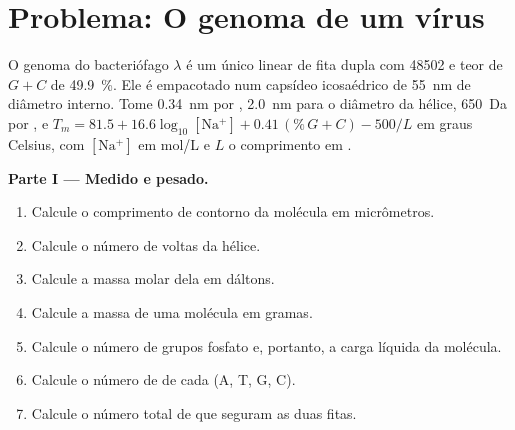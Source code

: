 \section{Problema: O genoma de um vírus}

\begin{problem}
\label{pb:b1:nucleic-acids:1}
O genoma do bacteriófago $\lambda$ é um único  linear de fita dupla
com \num{48502}  e teor de $G + C$ de \qty{49.9}{\%}. Ele
é empacotado num capsídeo icosaédrico de \qty{55}{nm} de diâmetro
interno. Tome \qty{0.34}{nm} por , \qty{2.0}{nm} para o
diâmetro da hélice, \qty{650}{Da} por , e
$T_m = 81.5 + 16.6\log_{10}[\mathrm{Na^+}]
+ 0.41\,(\%\,G{+}C) - 500/L$ em graus Celsius, com $[\mathrm{Na^+}]$ em
\unit{mol/L} e $L$ o comprimento em .

\medskip
\noindent\textbf{Parte I --- Medido e pesado.}
\begin{enumerate}
  \item Calcule o comprimento de contorno da molécula em micrômetros.
  \item Calcule o número de voltas da hélice.
  \item Calcule a massa molar dela em dáltons.
  \item Calcule a massa de uma molécula em gramas.
  \item Calcule o número de grupos fosfato e, portanto, a carga líquida
        da molécula.
  \item Calcule o número de  de cada  (A, T, G, C).
  \item Calcule o número total de  que seguram as
        duas fitas.
\end{enumerate}


\end{problem}
